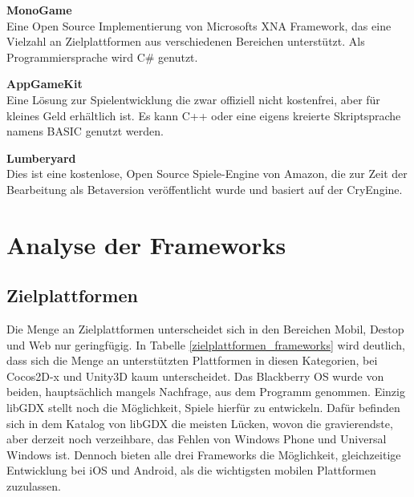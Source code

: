 \bigskip
\textbf{MonoGame}\\
Eine Open Source Implementierung von Microsofts XNA Framework, das eine Vielzahl an Zielplattformen aus verschiedenen Bereichen unterstützt. Als Programmiersprache wird C\# genutzt. \citep{monogame}

\bigskip
\textbf{AppGameKit}\\
Eine Lösung zur Spielentwicklung die zwar offiziell nicht kostenfrei, aber für kleines Geld erhältlich ist. Es kann C++ oder eine eigens kreierte Skriptsprache namens BASIC genutzt werden. \citep{appgamekit}

\bigskip
\textbf{Lumberyard}\\
Dies ist eine kostenlose, Open Source Spiele-Engine von Amazon, die zur Zeit der Bearbeitung als Betaversion veröffentlicht wurde und basiert auf der CryEngine. \citep{lumberyard}


\chapter{Analyse der Frameworks}
\label{chapter:Analyse_der_Frameworks}

\section{Zielplattformen}
Die Menge an Zielplattformen unterscheidet sich in den Bereichen Mobil, Destop und Web nur geringfügig. In Tabelle \ref{zielplattformen_frameworks} wird deutlich, dass sich die Menge an unterstützten Plattformen in diesen Kategorien, bei Cocos2D-x und Unity3D kaum unterscheidet. Das Blackberry OS wurde von beiden, hauptsächlich mangels Nachfrage, aus dem Programm genommen. Einzig libGDX stellt noch die Möglichkeit, Spiele hierfür zu entwickeln. Dafür befinden sich in dem Katalog von libGDX die meisten Lücken, wovon die gravierendste, aber derzeit noch verzeihbare, das Fehlen von Windows Phone und Universal Windows ist. Dennoch bieten alle drei Frameworks die Möglichkeit, gleichzeitige Entwicklung bei iOS und Android, als die wichtigsten mobilen Plattformen zuzulassen. 

